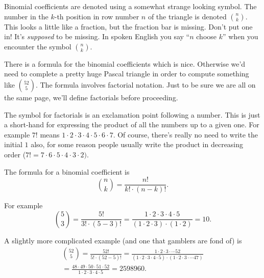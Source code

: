 \documentclass[10pt,]{book}
\theoremstyle{plain}
\theoremstyle{definition}
\theoremstyle{definition}
\numberwithin{equation}{section}
\begin{document}
      Binomial coefficients are denoted using a somewhat strange looking
      symbol. The number in the \(k\)-th position in row number \(n\) of
      the triangle is denoted \(\displaystyle \binom{n}{k}\). This looks
      a little like a fraction, but the fraction bar is missing. Don't
      put one in! It's \emph{supposed} to be missing. In spoken English
      you say ``\(n\) choose \(k\)'' when you encounter the symbol \(\displaystyle \binom{n}{k}\).
\par

      There is a formula for the binomial coefficients \textemdash{} which is nice. Otherwise
      we'd need to complete a pretty huge Pascal triangle in order to compute
      something like \(\displaystyle \binom{52}{5}\). The formula involves
       factorial notation. Just to be sure we are
      all on the same page, we'll define factorials before proceeding.
\par

      The symbol for factorials is an exclamation point following a number.
      This is just a short-hand for expressing the
      product of all the numbers up to a given one.
      For example \(7!\) means \(1\cdot 2\cdot 3\cdot 4\cdot 5\cdot 6\cdot 7\).
      Of course, there's really no need to write the initial \(1\) \textemdash{} also,
      for some reason people usually write the product in decreasing order
      (\(7! = 7 \cdot 6 \cdot 5 \cdot 4 \cdot 3 \cdot 2)\).
\par

      The formula for a binomial coefficient is
      \begin{equation*}
        \binom{n}{k} = \frac{n!}{k! \cdot (n-k)!}.
      \end{equation*}
\par

      For example
      \begin{equation*}
        \binom{5}{3} = \frac{5!}{3! \cdot (5-3)!} = \frac{1\cdot 2\cdot 3\cdot 4\cdot 5}{(1\cdot 2\cdot 3) \cdot (1\cdot 2)} = 10.
      \end{equation*}
\par

      A slightly more complicated example (and one that gamblers are fond of)
      is
      \begin{gather*}
\binom{52}{5} = \frac{52!}{5! \cdot (52-5)!} 
         = \frac{1\cdot 2\cdot 3\cdot \cdots 52}{(1\cdot 2\cdot 3 \cdot 4 \cdot 5) \cdot (1\cdot 2 \cdot 3\cdot \cdots 47)}\\
= \frac{48 \cdot 49 \cdot 50 \cdot 51 \cdot 52}{1\cdot 2\cdot 3 \cdot 4 \cdot 5} = 2598960.
\end{gather*}
\par
\end{document}
